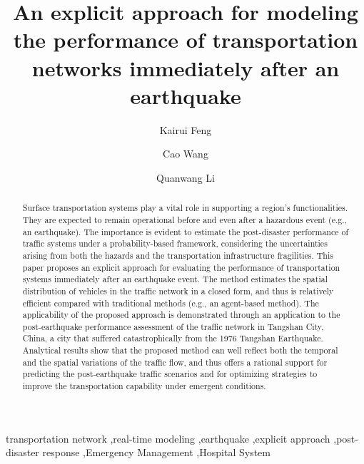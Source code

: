 \documentclass[review,11pt,nonatbib]{elsarticle}
\begin{document}
\begin{frontmatter}

\title{An explicit approach for modeling the performance of transportation networks immediately after an earthquake}
\author[add1,add2]{Kairui Feng}
\author[add3]{Cao Wang}
\author[add1]{Quanwang Li}

\address[add1]{Department of Civil Engineering, Tsinghua University, Beijing 100084, China}
\address[add2]{Department of Civil and Environmental Engineering, Princeton University, Princeton, NJ 08540, USA}
\address[add3]{School of Civil, Mining and Environmental Engineering, University of Wollongong, Wollongong, NSW 2522, Australia}

\begin{abstract}
  Surface transportation systems play a vital role in supporting a region's functionalities. They are expected to remain operational before and even after a hazardous event (e.g., an earthquake). The importance is evident to estimate the post-disaster performance of traffic systems under a probability-based framework, considering the uncertainties arising from both the hazards and the transportation infrastructure fragilities. This paper proposes an explicit approach for evaluating the performance of transportation systems immediately after an earthquake event. The method estimates the spatial distribution of vehicles in the traffic network in a closed form, and thus is relatively efficient compared with traditional methods (e.g., an agent-based method). The applicability of the proposed approach is demonstrated through an application to the post-earthquake performance assessment of the traffic network in Tangshan City, China, a city that suffered catastrophically from the 1976 Tangshan Earthquake. Analytical results show that the proposed method can well reflect both the temporal and the spatial variations of the traffic flow, and thus offers a rational support for predicting the post-earthquake traffic scenarios and for optimizing strategies to improve the transportation capability under emergent conditions.
\end{abstract}

\begin{keyword}
transportation network \sep real-time modeling \sep earthquake \sep explicit approach \sep post-disaster response \sep Emergency Management \sep Hospital System
\end{keyword}

\end{frontmatter}
\end{document}
